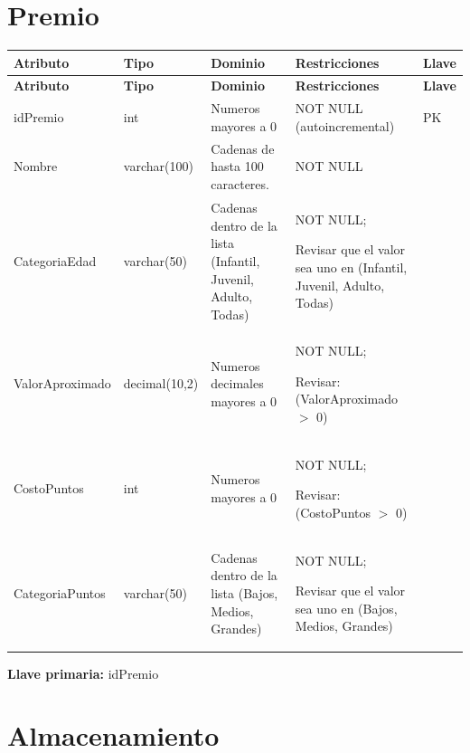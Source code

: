 \documentclass[12pt]{article}
\begin{document}
\section*{Premio}

\begin{longtable}{p{3.2cm} p{2.2cm} p{5.8cm} p{4.2cm} p{1.2cm}}
\label{tab:premio}\\
\toprule
\textbf{Atributo} & \textbf{Tipo} & \textbf{Dominio} & \textbf{Restricciones} & \textbf{Llave} \\
\midrule
\endfirsthead

\toprule
\textbf{Atributo} & \textbf{Tipo} & \textbf{Dominio} & \textbf{Restricciones} & \textbf{Llave} \\
\midrule
\endhead

\bottomrule
\endfoot


idPremio 
& int 
& Numeros mayores a 0
& NOT NULL (autoincremental)
& PK \\

Nombre 
& varchar(100) 
& Cadenas de hasta 100 caracteres.
& NOT NULL
&  \\

CategoriaEdad 
& varchar(50) 
& Cadenas dentro de la lista (Infantil, Juvenil, Adulto, Todas)
& NOT NULL;

Revisar que el valor sea uno en (Infantil, Juvenil, Adulto, Todas)
&  \\

ValorAproximado 
& decimal(10,2) 
& Numeros decimales mayores a 0
& NOT NULL;

Revisar: (ValorAproximado $>$ 0)
&  \\

CostoPuntos 
& int 
& Numeros mayores a 0
& NOT NULL;

Revisar: (CostoPuntos $>$ 0)
&  \\

CategoriaPuntos 
& varchar(50) 
& Cadenas dentro de la lista (Bajos, Medios, Grandes)
& NOT NULL;

Revisar que el valor sea uno en (Bajos, Medios, Grandes)
&  \\

\end{longtable}

\textbf{Llave primaria:} idPremio\\


\section*{Almacenamiento}
\end{document}
